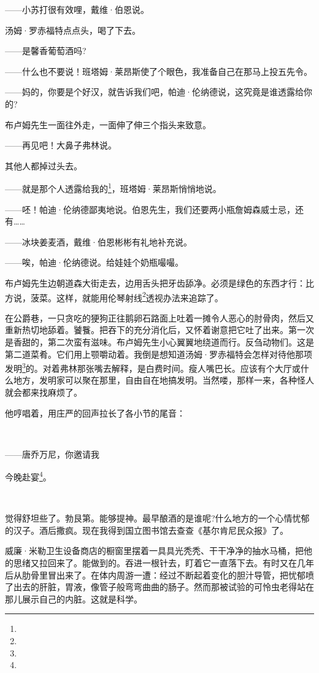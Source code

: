 \par ——小苏打很有效哩，戴维·伯恩说。
\par 汤姆·罗赤福特点点头，喝了下去。
\par ——是馨香葡萄酒吗?
\par ——什么也不要说！班塔姆·莱昂斯使了个眼色，我准备自己在那马上投五先令。
\par ——妈的，你要是个好汉，就告诉我们吧，帕迪·伦纳德说，这究竟是谁透露给你的?
\par 布卢姆先生一面往外走，一面伸了伸三个指头来致意。
\par ——再见吧！大鼻子弗林说。
\par 其他人都掉过头去。
\par ——就是那个人透露给我的\footnote{}，班塔姆·莱昂斯悄悄地说。
\par ——呸！帕迪·伦纳德鄙夷地说。伯恩先生，我们还要两小瓶詹姆森威士忌，还有……
\par ——冰块姜麦酒，戴维·伯恩彬彬有礼地补充说。
\par ——唉，帕迪·伦纳德说。给娃娃个奶瓶嘬嘬。
\par 布卢姆先生边朝道森大街走去，边用舌头把牙齿舔净。必须是绿色的东西才行：比方说，菠菜。这样，就能用伦琴射线\footnote{}透视办法来追踪了。
\par 在公爵巷，一只贪吃的㹴狗正往鹅卵石路面上吐着一摊令人恶心的肘骨肉，然后又重新热切地舔着。饕餮。把吞下的充分消化后，又怀着谢意把它吐了出来。第一次是香甜的，第二次蛮有滋味。布卢姆先生小心翼翼地绕道而行。反刍动物们。这是第二道菜肴。它们用上颚嚼动着。我倒是想知道汤姆·罗赤福特会怎样对待他那项发明\footnote{}的。对着弗林那张嘴去解释，是白费时间。瘦人嘴巴长。应该有个大厅或什么地方，发明家可以聚在那里，自由自在地搞发明。当然喽，那样一来，各种怪人就会都来找麻烦了。
\par 他哼唱着，用庄严的回声拉长了各小节的尾音：
\par  
\par ——唐乔万尼，你邀请我
\par 今晚赴宴\footnote{}。
\par  
\par 觉得舒坦些了。勃艮第。能够提神。最早酿酒的是谁呢?什么地方的一个心情忧郁的汉子。酒后撒疯。现在我得到国立图书馆去查查《基尔肯尼民众报》了。
\par 威廉·米勒卫生设备商店的橱窗里摆着一具具光秃秃、干干净净的抽水马桶，把他的思绪又拉回来了。能做到的。吞进一根针去，盯着它一直落下去。有时又在几年后从肋骨里冒出来了。在体内周游一遭：经过不断起着变化的胆汁导管，把忧郁喷了出去的肝脏，胃液，像管子般弯弯曲曲的肠子。然而那被试验的可怜虫老得站在那儿展示自己的内脏。这就是科学。
